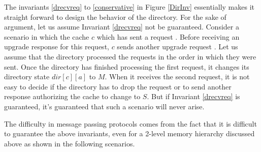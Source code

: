 The invariants \ref{drecvreq} to \ref{conservative} in Figure \ref{DirInv}
essentially makes it straight forward to design the behavior of the directory.
For the sake of argument, let us assume Invariant \ref{drecvreq} not be
guaranteed. Consider a scenario in which the cache $c$ which has sent a request
. Before receiving an upgrade response for this request, $c$
sends another upgrade request . Let us assume that the
directory processed the requests in the order in which they were sent. Once the
directory has finished processing the first request, it changes its directory
state $dir[c][a]$ to $M$. When it receives the second request, it is not easy to
decide if the directory has to drop the request or to send another response
authorizing the cache to change to $S$. But if Invariant \ref{drecvreq} is
guaranteed, it's guaranteed that such a scenario will never arise.

The difficulty in message passing protocols comes from the fact that it is
difficult to guarantee the above invariants, even for a 2-level memory hierarchy
discussed above as shown in the following scenarios.

%

